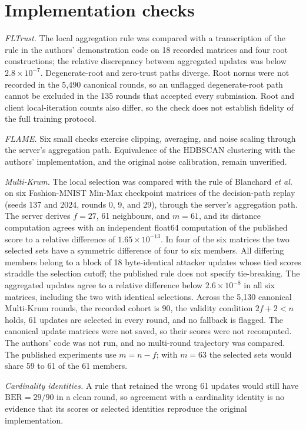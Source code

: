 \documentclass[journal]{IEEEtran}
\begin{document}
\section{Implementation checks}
\emph{FLTrust.} The local aggregation rule was compared with a transcription of the rule in the authors' demonstration code on 18 recorded matrices and four root constructions; the relative discrepancy between aggregated updates was below $2.8\times10^{-7}$. Degenerate-root and zero-trust paths diverge. Root norms were not recorded in the 5{,}490 canonical rounds, so an unflagged degenerate-root path cannot be excluded in the 135 rounds that accepted every submission. Root and client local-iteration counts also differ, so the check does not establish fidelity of the full training protocol.

\emph{FLAME.} Six small checks exercise clipping, averaging, and noise scaling through the server's aggregation path. Equivalence of the HDBSCAN clustering with the authors' implementation, and the original noise calibration, remain unverified.

\emph{Multi-Krum.} The local selection was compared with the rule of Blanchard \emph{et al.} on six Fashion-MNIST Min-Max checkpoint matrices of the decision-path replay (seeds 137 and 2024, rounds 0, 9, and 29), through the server's aggregation path. The server derives $f=27$, 61 neighbours, and $m=61$, and its distance computation agrees with an independent float64 computation of the published score to a relative difference of $1.65\times10^{-13}$. In four of the six matrices the two selected sets have a symmetric difference of four to six members. All differing members belong to a block of 18 byte-identical attacker updates whose tied scores straddle the selection cutoff; the published rule does not specify tie-breaking. The aggregated updates agree to a relative difference below $2.6\times10^{-8}$ in all six matrices, including the two with identical selections. Across the 5{,}130 canonical Multi-Krum rounds, the recorded cohort is 90, the validity condition $2f+2<n$ holds, 61 updates are selected in every round, and no fallback is flagged. The canonical update matrices were not saved, so their scores were not recomputed. The authors' code was not run, and no multi-round trajectory was compared. The published experiments use $m=n-f$; with $m=63$ the selected sets would share 59 to 61 of the 61 members.

\emph{Cardinality identities.} A rule that retained the wrong 61 updates would still have $\mathrm{BER}=29/90$ in a clean round, so agreement with a cardinality identity is no evidence that its scores or selected identities reproduce the original implementation.
\end{document}
